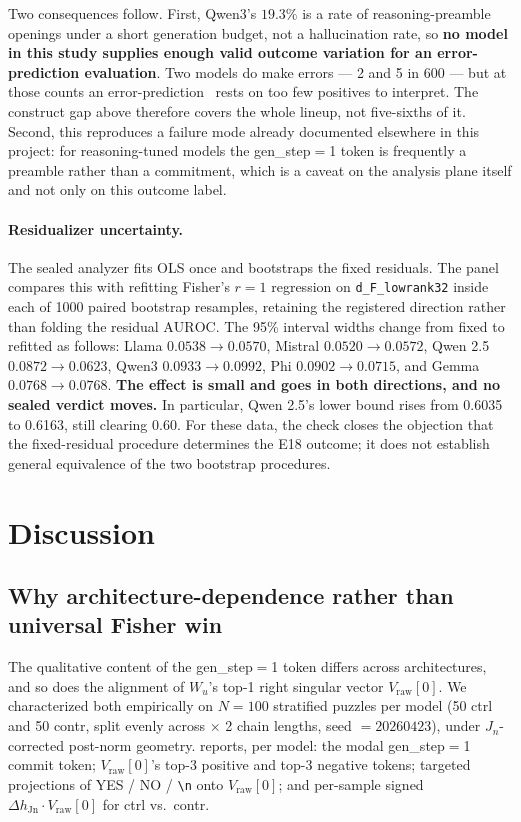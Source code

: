 \documentclass[10pt, letterpaper]{article}
\renewcommand{\dh}{\Delta h}
\newcommand{\Wu}{W_u}
\newcommand{\Jn}{J_n}
\newcommand{\auroc}{\text{AUROC}}
\begin{document}
Two consequences follow. First, Qwen3's $19.3\%$ is a rate of
reasoning-preamble openings under a short generation budget, not a
hallucination rate, so \textbf{no model in this study supplies enough
valid outcome variation for an error-prediction evaluation}. Two models
do make errors --- 2 and 5 in 600 --- but at those counts an
error-prediction \auroc\ rests on too few positives to interpret. The
construct gap above therefore covers the whole lineup, not five-sixths
of it. Second, this reproduces a failure mode already documented
elsewhere in this project: for reasoning-tuned models the
gen\_step$=$1 token is frequently a preamble rather than a commitment,
which is a caveat on the analysis plane itself and not only on this
outcome label.

\paragraph{Residualizer uncertainty.}
The sealed analyzer fits OLS once and bootstraps the fixed residuals.
The panel compares this with refitting Fisher's $r=1$ regression on
\texttt{d\_F\_lowrank32} inside each of 1000 paired bootstrap
resamples, retaining the registered direction rather than folding
the residual $\auroc$. The 95\% interval widths change from fixed
to refitted as follows: Llama $0.0538\to0.0570$, Mistral
$0.0520\to0.0572$, Qwen 2.5 $0.0872\to0.0623$, Qwen3
$0.0933\to0.0992$, Phi $0.0902\to0.0715$, and Gemma
$0.0768\to0.0768$. \textbf{The effect is small and goes in both
directions, and no sealed verdict moves.} In particular, Qwen 2.5's
lower bound rises from 0.6035 to 0.6163, still clearing 0.60.
For these data, the check closes the objection that the fixed-residual
procedure determines the E18 outcome; it does not establish general
equivalence of the two bootstrap procedures.

\section{Discussion}
\label{sec:discussion}

\subsection{Why architecture-dependence rather than universal Fisher
win}
\label{sec:disc:mechanism}

The qualitative content of the gen\_step$=$1 token differs across
architectures, and so does the alignment of $\Wu$'s top-1 right
singular vector $V_\text{raw}[0]$. We characterized both empirically
on $N=100$ stratified puzzles per model (50 ctrl and 50 contr, split
evenly across
$\times$ 2 chain lengths, seed $= 20260423$), under $\Jn$-corrected
post-norm geometry.  reports, per model: the modal
gen\_step$=$1 commit token; $V_\text{raw}[0]$'s top-3 positive and
top-3 negative tokens; targeted projections of YES / NO / \texttt{\textbackslash n}
onto $V_\text{raw}[0]$; and per-sample signed
$\dh_\text{Jn} \cdot V_\text{raw}[0]$ for ctrl vs.\ contr.
\end{document}

